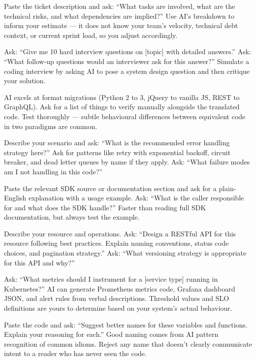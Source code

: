 {Paste the ticket description and ask: ``What tasks are involved, what are the
technical risks, and what dependencies are implied?''
Use AI's breakdown to inform your estimate --- it does not know your team's velocity,
technical debt context, or current sprint load, so you adjust accordingly.}

{Ask: ``Give me 10 hard interview questions on [topic] with detailed answers.''
Ask: ``What follow-up questions would an interviewer ask for this answer?''
Simulate a coding interview by asking AI to pose a system design question and then
critique your solution.}

{AI excels at format migrations (Python 2 to 3, jQuery to vanilla JS, REST to GraphQL).
Ask for a list of things to verify manually alongside the translated code.
Test thoroughly --- subtle behavioural differences between equivalent code in two
paradigms are common.}

{Describe your scenario and ask: ``What is the recommended error handling strategy
here?''
Ask for patterns like retry with exponential backoff, circuit breaker, and dead
letter queues by name if they apply.
Ask: ``What failure modes am I not handling in this code?''}

{Paste the relevant SDK source or documentation section and ask for a plain-English
explanation with a usage example.
Ask: ``What is the caller responsible for and what does the SDK handle?''
Faster than reading full SDK documentation, but always test the example.}

{Describe your resource and operations.
Ask: ``Design a RESTful API for this resource following best practices. Explain naming
conventions, status code choices, and pagination strategy.''
Ask: ``What versioning strategy is appropriate for this API and why?''}

{Ask: ``What metrics should I instrument for a [service type] running in Kubernetes?''
AI can generate Prometheus metrics code, Grafana dashboard JSON, and alert rules
from verbal descriptions.
Threshold values and SLO definitions are yours to determine based on your system's
actual behaviour.}

{Paste the code and ask: ``Suggest better names for these variables and functions.
Explain your reasoning for each.''
Good naming comes from AI pattern recognition of common idioms.
Reject any name that doesn't clearly communicate intent to a reader who has never
seen the code.}

